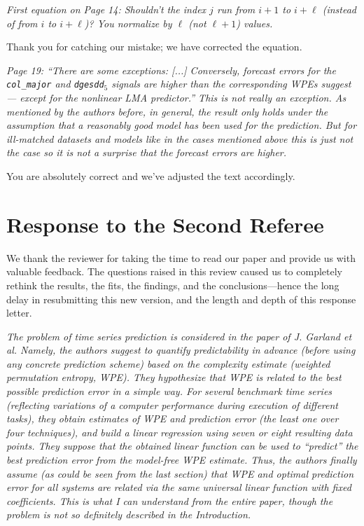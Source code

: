 \documentclass[12pt]{article}
\begin{document}
\emph{First equation on Page 14: Shouldn't the index $j$ run from $i+1$ to
$i+\ell$ (instead of from $i$ to $i+\ell$)? You normalize by $\ell$ (not
$\ell+1$) values.}

Thank you for catching our mistake; we have corrected the equation.

\smallskip

\emph{Page 19: ``There are some exceptions: [...] Conversely, forecast errors
for the \texttt{col\_major} and \texttt{dgesdd$_5$} signals are higher than the
corresponding WPEs suggest --- except for the nonlinear LMA predictor.'' This is
not really an exception. As mentioned by the authors before, in general, the
result only holds under the assumption that a reasonably good model has been
used for the prediction. But for ill-matched datasets and models like in the
cases mentioned above this is just not the case so it is not a surprise that the
forecast errors are higher.}

You are absolutely correct and we've adjusted the text accordingly.

\section*{Response to the Second Referee}

We thank the reviewer for taking the time to read our paper and
provide us with valuable feedback.  The questions raised in this
review caused us to completely rethink the results, the fits, the
findings, and the conclusions---hence the long delay in resubmitting
this new version, and the length and depth of this response letter.

\smallskip

\emph{The problem of time series prediction is considered in the paper
  of J.  Garland et al. Namely, the authors suggest to quantify
  predictability in advance (before using any concrete prediction
  scheme) based on the complexity estimate (weighted permutation
  entropy, WPE). They hypothesize that WPE is related to the best
  possible prediction error in a simple way. For several benchmark
  time series (reflecting variations of a computer performance during
  execution of different tasks), they obtain estimates of WPE and
  prediction error (the least one over four techniques), and build a
  linear regression using seven or eight resulting data points. They
  suppose that the obtained linear function can be used to ``predict''
  the best prediction error from the model-free WPE estimate.  Thus,
  the authors finally assume (as could be seen from the last section)
  that WPE and optimal prediction error for all systems are related
  via the same universal linear function with fixed coefficients. This
  is what I can understand from the entire paper, though the problem
  is not so definitely described in the Introduction.}
\end{document}
